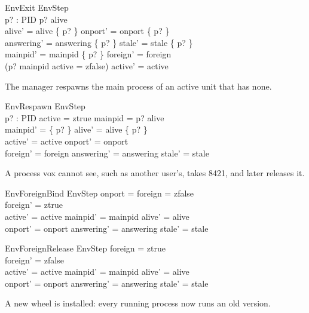\documentclass[a4paper,10pt,fleqn]{article}
\begin{document}
\begin{schema}{EnvExit}
  EnvStep \\
  p? : PID
\where
  p? \in alive \\
  alive' = alive \setminus \{ p? \} \land onport' = onport \setminus \{ p? \}
    \\
  answering' = answering \setminus \{ p? \} \land
    stale' = stale \setminus \{ p? \} \\
  mainpid' = mainpid \setminus \{ p? \} \land foreign' = foreign \\
  (p? \notin mainpid \lor active = zfalse) \implies active' = active
\end{schema}

The manager respawns the main process of an active unit that has none.

\begin{schema}{EnvRespawn}
  EnvStep \\
  p? : PID
\where
  active = ztrue \land mainpid = \emptyset \land p? \notin alive \\
  mainpid' = \{ p? \} \land alive' = alive \cup \{ p? \} \\
  active' = active \land onport' = onport \\
  foreign' = foreign \land answering' = answering \land stale' = stale
\end{schema}

A process vox cannot see, such as another user's, takes 8421, and later
releases it.

\begin{schema}{EnvForeignBind}
  EnvStep
\where
  onport = \emptyset \land foreign = zfalse \\
  foreign' = ztrue \\
  active' = active \land mainpid' = mainpid \land alive' = alive \\
  onport' = onport \land answering' = answering \land stale' = stale
\end{schema}

\begin{schema}{EnvForeignRelease}
  EnvStep
\where
  foreign = ztrue \\
  foreign' = zfalse \\
  active' = active \land mainpid' = mainpid \land alive' = alive \\
  onport' = onport \land answering' = answering \land stale' = stale
\end{schema}

A new wheel is installed: every running process now runs an old version.
\end{document}
